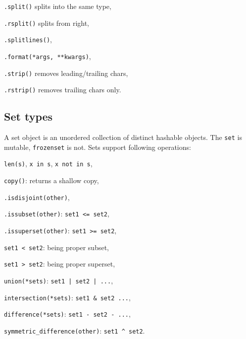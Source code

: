 \begin{compactenum}
\begin{compactenum}
\item \texttt{.split()} splits into the same type,
\item \texttt{.rsplit()} splits from right,
\item \texttt{.splitlines()},
\end{compactenum}
\item \texttt{.format(*args, **kwargs)},
\item \texttt{.strip()} removes leading/trailing chars,
\item \texttt{.rstrip()} removes trailing chars only.
\end{compactenum}


\subsection{Set types}
A set object is an unordered collection of distinct hashable objects.
The \texttt{set} is mutable, \texttt{frozenset} is not.
Sets support following operations:
\begin{compactenum}
	\item \texttt{len(s)}, \texttt{x in s}, \texttt{x not in s},
	\item \texttt{copy()}: returns a shallow copy,
	\item \texttt{.isdisjoint(other)},
	\item \texttt{.issubset(other)}: \texttt{set1 <= set2},
	\item \texttt{.issuperset(other)}: \texttt{set1 >= set2},
	\item \texttt{set1 < set2}: being proper subset,
	\item \texttt{set1 > set2}: being proper superset,
	\item \texttt{union(*sets)}: \texttt{set1 | set2 | ...},
	\item \texttt{intersection(*sets)}: \texttt{set1 & set2 ...}, 
	\item \texttt{difference(*sets)}: \texttt{set1 - set2 - ...}, 
	\item \texttt{symmetric_difference(other)}: \texttt{set1 ^ set2}.
\end{compactenum}

